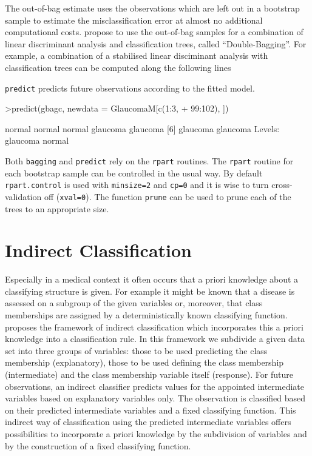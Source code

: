 \documentclass[11pt]{article}
\begin{document}
The out-of-bag estimate uses the observations which are left out in a
bootstrap sample to estimate the misclassification error at almost no
additional computational costs. 
\cite{double-bag:2002} propose to use the
out-of-bag samples for a combination of linear discriminant analysis and
classification trees, called ``Double-Bagging''. For example, a combination
of a stabilised linear disciminant analysis with classification trees can be
computed along the following lines
\begin{Schunk}
\end{Schunk}
\texttt{predict} predicts future observations according to the 
fitted model.
\begin{Schunk}
\begin{Sinput}
>predict(gbagc, newdata = GlaucomaM[c(1:3, 
+     99:102), ])
\end{Sinput}
\begin{Soutput}
[1] normal   normal   normal   glaucoma glaucoma
[6] glaucoma glaucoma
Levels: glaucoma normal
\end{Soutput}
\end{Schunk}
Both \texttt{bagging} and \texttt{predict} rely on the \texttt{rpart}
routines.  The \texttt{rpart} routine for each bootstrap sample
can be controlled in the usual way. By default \texttt{rpart.control} is used
with \texttt{minsize=2} and \texttt{cp=0} and it is wise to turn
cross-validation off (\texttt{xval=0}). The function \texttt{prune} can
be used to prune each of the trees to an
appropriate size.

\section{Indirect Classification}
Especially in a medical context it often occurs that a priori 
knowledge about a classifying structure is given. For example 
it might be known that a disease is assessed on a subgroup of 
the given variables or, moreover, that class memberships are 
assigned by a deterministically known classifying function. 
\cite{hand:2001} proposes the framework of indirect classification 
which incorporates this a priori knowledge into a classification rule. 
In this framework we subdivide a given data set into three groups of 
variables: those to be used  predicting the class membership 
(explanatory), those to be used defining the class membership 
(intermediate) and the class membership variable itself (response). 
For future observations, an indirect classifier predicts values 
for the appointed intermediate variables based
on explanatory variables only. The observation is classified 
based on their predicted intermediate variables and a fixed 
classifying function. This indirect way of classification using 
the predicted intermediate variables offers possibilities to 
incorporate a priori knowledge by the subdivision of variables and 
by the construction of a fixed classifying function.
\end{document}
